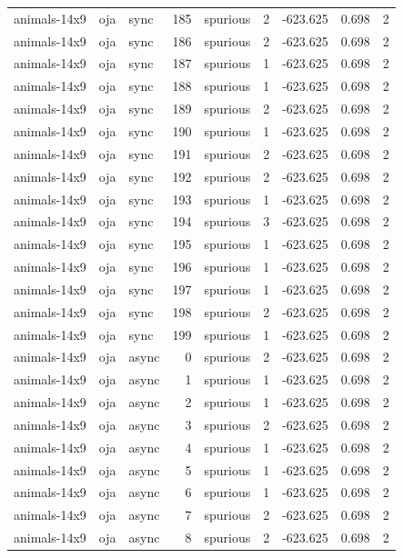 \begin{tabular}{lllrlrrrr}
animals-14x9 & oja & sync & 185 & spurious & 2 & -623.625 & 0.698 & 2 \\
animals-14x9 & oja & sync & 186 & spurious & 2 & -623.625 & 0.698 & 2 \\
animals-14x9 & oja & sync & 187 & spurious & 1 & -623.625 & 0.698 & 2 \\
animals-14x9 & oja & sync & 188 & spurious & 1 & -623.625 & 0.698 & 2 \\
animals-14x9 & oja & sync & 189 & spurious & 2 & -623.625 & 0.698 & 2 \\
animals-14x9 & oja & sync & 190 & spurious & 1 & -623.625 & 0.698 & 2 \\
animals-14x9 & oja & sync & 191 & spurious & 2 & -623.625 & 0.698 & 2 \\
animals-14x9 & oja & sync & 192 & spurious & 2 & -623.625 & 0.698 & 2 \\
animals-14x9 & oja & sync & 193 & spurious & 1 & -623.625 & 0.698 & 2 \\
animals-14x9 & oja & sync & 194 & spurious & 3 & -623.625 & 0.698 & 2 \\
animals-14x9 & oja & sync & 195 & spurious & 1 & -623.625 & 0.698 & 2 \\
animals-14x9 & oja & sync & 196 & spurious & 1 & -623.625 & 0.698 & 2 \\
animals-14x9 & oja & sync & 197 & spurious & 1 & -623.625 & 0.698 & 2 \\
animals-14x9 & oja & sync & 198 & spurious & 2 & -623.625 & 0.698 & 2 \\
animals-14x9 & oja & sync & 199 & spurious & 1 & -623.625 & 0.698 & 2 \\
animals-14x9 & oja & async & 0 & spurious & 2 & -623.625 & 0.698 & 2 \\
animals-14x9 & oja & async & 1 & spurious & 1 & -623.625 & 0.698 & 2 \\
animals-14x9 & oja & async & 2 & spurious & 1 & -623.625 & 0.698 & 2 \\
animals-14x9 & oja & async & 3 & spurious & 2 & -623.625 & 0.698 & 2 \\
animals-14x9 & oja & async & 4 & spurious & 1 & -623.625 & 0.698 & 2 \\
animals-14x9 & oja & async & 5 & spurious & 1 & -623.625 & 0.698 & 2 \\
animals-14x9 & oja & async & 6 & spurious & 1 & -623.625 & 0.698 & 2 \\
animals-14x9 & oja & async & 7 & spurious & 2 & -623.625 & 0.698 & 2 \\
animals-14x9 & oja & async & 8 & spurious & 2 & -623.625 & 0.698 & 2 \\

\end{tabular}
